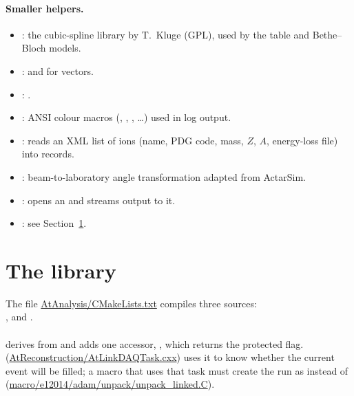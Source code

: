 \paragraph{Smaller helpers.}
\begin{itemize}
\item {}: the  cubic-spline library by T.~Kluge (GPL), used by the table and
  Bethe--Bloch models.
\item {}:  and  for
   vectors.
\item {}: .
\item {}: ANSI colour macros (, , , \ldots) used in log output.
\item {}:  reads an XML list of ions (name, PDG code, mass, $Z$, $A$,
  energy-loss file) into  records.
\item {}: beam-to-laboratory angle transformation adapted from ActarSim.
\item {}: opens an  and streams output to it.
\item {}: see Section~\ref{sec:tools-ana}.
\end{itemize}

\section{The  library}
\label{sec:tools-ana}

The file \url{AtAnalysis/CMakeLists.txt} compiles three sources:\\ ,
 and .

\paragraph{} derives from  and adds one accessor, , which returns
the protected  flag.  (\url{AtReconstruction/AtLinkDAQTask.cxx}) uses it to know
whether the current event will be filled; a macro that uses that task must create the run as  instead
of  (\url{macro/e12014/adam/unpack/unpack_linked.C}).

